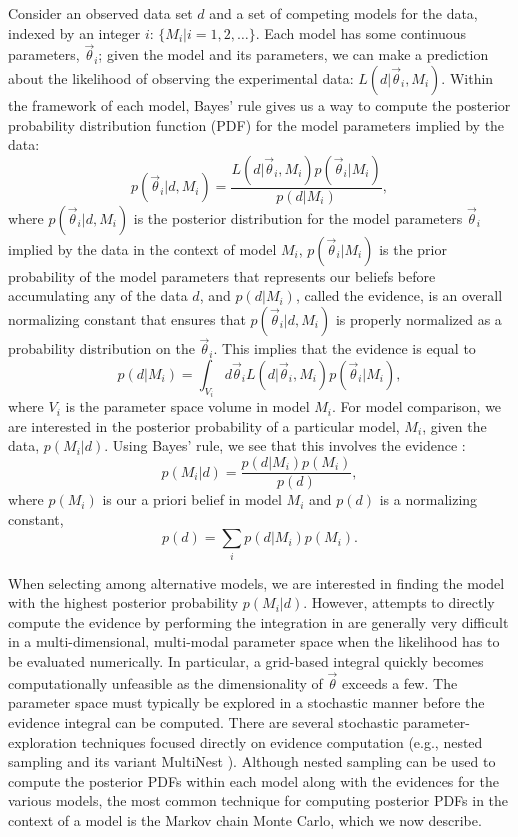 \documentclass{iopart}
\newcommand{\vtheta}{\vec{\theta}}
\newcommand{\be}{\begin{equation}}
\newcommand{\ee}{\end{equation}}
\newcommand{\bel}[1]{\begin{equation}\label{#1}}
\begin{document}
Consider an observed data set $d$ and a set of competing models for
the data, indexed by an integer $i$: $\{M_i | i = 1, 2, \ldots \}$.
Each model has some continuous parameters, $\vtheta_i$; given the
model and its parameters, we can make a prediction about the
likelihood of observing the experimental data: $L(d|\vtheta_i, M_i)$.
Within the framework of each model, Bayes' rule gives us a way to
compute the posterior probability distribution function (PDF) for the
model parameters implied by the data:
\be
  p(\vtheta_i | d, M_i) = \frac{L(d|\vtheta_i, M_i) p(\vtheta_i|M_i)}{p(d|M_i)},
\ee
where $p(\vtheta_i |d, M_i)$ is the posterior distribution for the
model parameters $\vtheta_i$ implied by the data in the context of
model $M_i$, $p(\vtheta_i|M_i)$ is the prior probability of the model
parameters that represents our beliefs before accumulating any of the
data $d$, and $p(d|M_i)$, called the evidence, is an overall
normalizing constant that ensures that $p(\vtheta_i|d,M_i)$ is
properly normalized as a probability distribution on the $\vtheta_i$.
This implies that the evidence is equal to
\bel{evidence}
  p(d|M_i) = \int_{V_i} d\vtheta_i L(d|\vtheta_i, M_i) p(\vtheta_i|M_i),
\ee
where $V_i$ is the parameter space volume in model $M_i$.  For model
comparison, we are interested in the posterior probability of a
particular model, $M_i$, given the data, $p(M_i|d)$.  Using Bayes'
rule, we see that this involves the evidence :
\be
p(M_i|d) = \frac{p(d|M_i) p(M_i)}{p(d)},
\ee
where $p(M_i)$ is our a priori belief in model $M_i$ and $p(d)$ is a
normalizing constant,
\be
p(d)=\sum_i p(d|M_i) p(M_i).
\ee

When selecting among alternative models, we are interested in finding
the model with the highest posterior probability $p(M_i|d)$.  However,
attempts to directly compute the evidence by performing the
integration in  are generally very difficult in a
multi-dimensional, multi-modal parameter space when the likelihood has
to be evaluated numerically.  In particular, a grid-based integral
quickly becomes computationally unfeasible as the dimensionality of
$\vtheta$ exceeds a few.  The parameter space must typically be
explored in a stochastic manner before the evidence integral can be
computed.  There are several stochastic parameter-exploration
techniques focused directly on evidence computation (e.g., nested
sampling \cite{Skilling:2004,Skilling:2006} and its variant MultiNest
\cite{Feroz:2009}).  Although nested sampling can be used to compute
the posterior PDFs within each model along with the evidences for the
various models, the most common technique for computing posterior PDFs
in the context of a model is the Markov chain Monte Carlo, which we
now describe.
\end{document}
